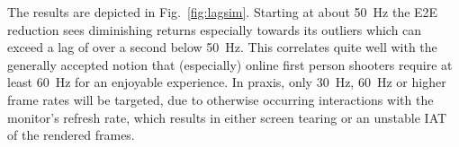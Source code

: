 The results are depicted in Fig.~\ref{fig:lagsim}. Starting at about \SI{50}{\hertz} the \gls{E2E} reduction sees diminishing returns especially towards its outliers which can exceed a lag of over a second below \SI{50}{\hertz}. This correlates quite well with the generally accepted notion that (especially) online first person shooters require at least \SI{60}{\hertz} for an enjoyable experience. In praxis, only \SI{30}{\hertz}, \SI{60}{\hertz} or higher frame rates will be targeted, due to otherwise occurring interactions with the monitor's refresh rate, which results in either screen tearing or an unstable \gls{IAT} of the rendered frames.
